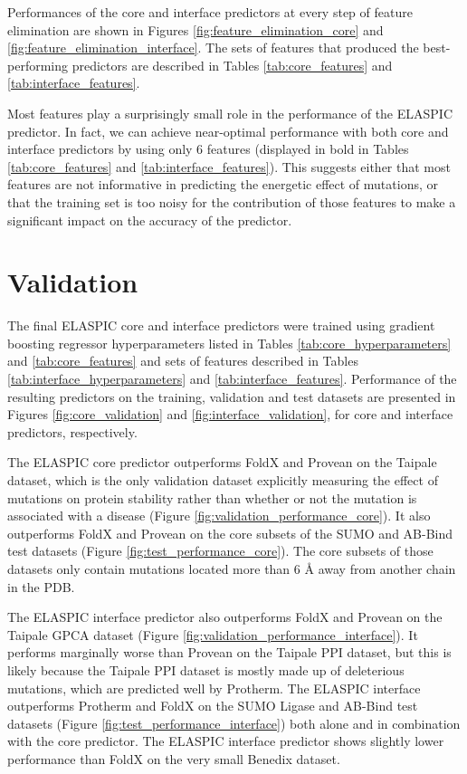 Performances of the core and interface predictors at every step of feature elimination are shown in Figures \ref{fig:feature_elimination_core} and \ref{fig:feature_elimination_interface}. The sets of features that produced the best-performing predictors are described in Tables \ref{tab:core_features} and \ref{tab:interface_features}.

Most features play a surprisingly small role in the performance of the ELASPIC predictor. In fact, we can achieve near-optimal performance with both core and interface predictors by using only 6 features (displayed in bold in Tables \ref{tab:core_features} and \ref{tab:interface_features}). This suggests either that most features are not informative in predicting the energetic effect of mutations, or that the training set is too noisy for the contribution of those features to make a significant impact on the accuracy of the predictor.

\clearpage



\clearpage
\section{Validation} \label{sec:validation}

The final ELASPIC core and interface predictors were trained using gradient boosting regressor hyperparameters listed in Tables \ref{tab:core_hyperparameters} and \ref{tab:core_features} and sets of features described in Tables \ref{tab:interface_hyperparameters} and \ref{tab:interface_features}. Performance of the resulting predictors on the training, validation and test datasets are presented in Figures \ref{fig:core_validation} and \ref{fig:interface_validation}, for core and interface predictors, respectively.

The ELASPIC core predictor outperforms FoldX and Provean on the Taipale dataset, which is the only validation dataset explicitly measuring the effect of mutations on protein stability rather than whether or not the mutation is associated with a disease (Figure \ref{fig:validation_performance_core}). It also outperforms FoldX and Provean on the core subsets of the SUMO and AB-Bind test datasets (Figure \ref{fig:test_performance_core}). The core subsets of those datasets only contain mutations located more than 6 {\AA} away from another chain in the PDB.

The ELASPIC interface predictor also outperforms FoldX and Provean on the Taipale GPCA dataset (Figure \ref{fig:validation_performance_interface}). It performs marginally worse than Provean on the Taipale PPI dataset, but this is likely because the Taipale PPI dataset is mostly made up of deleterious mutations, which are predicted well by Protherm. The ELASPIC interface outperforms Protherm and FoldX on the SUMO Ligase and AB-Bind test datasets (Figure \ref{fig:test_performance_interface}) both alone and in combination with the core predictor. The ELASPIC interface predictor shows slightly lower performance than FoldX on the very small Benedix dataset.

